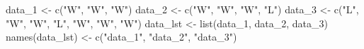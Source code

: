 \documentclass[
]{book}
\newenvironment{Shaded}{\begin{snugshade}}{\end{snugshade}}
\newcommand{\FunctionTok}[1]{\textcolor[rgb]{0.00,0.00,0.00}{#1}}
\newcommand{\NormalTok}[1]{#1}
\newcommand{\OtherTok}[1]{\textcolor[rgb]{0.56,0.35,0.01}{#1}}
\newcommand{\StringTok}[1]{\textcolor[rgb]{0.31,0.60,0.02}{#1}}
\begin{document}
\begin{Shaded}
\begin{Highlighting}[]
\NormalTok{data\_1 }\OtherTok{\textless{}{-}} \FunctionTok{c}\NormalTok{(}\StringTok{"W"}\NormalTok{, }\StringTok{"W"}\NormalTok{, }\StringTok{"W"}\NormalTok{)}
\NormalTok{data\_2 }\OtherTok{\textless{}{-}} \FunctionTok{c}\NormalTok{(}\StringTok{"W"}\NormalTok{, }\StringTok{"W"}\NormalTok{, }\StringTok{"W"}\NormalTok{, }\StringTok{"L"}\NormalTok{)}
\NormalTok{data\_3 }\OtherTok{\textless{}{-}} \FunctionTok{c}\NormalTok{(}\StringTok{"L"}\NormalTok{, }\StringTok{"W"}\NormalTok{, }\StringTok{"W"}\NormalTok{, }\StringTok{"L"}\NormalTok{, }\StringTok{"W"}\NormalTok{, }\StringTok{"W"}\NormalTok{, }\StringTok{"W"}\NormalTok{)}
\NormalTok{data\_lst }\OtherTok{\textless{}{-}} \FunctionTok{list}\NormalTok{(data\_1, data\_2, data\_3)}
\FunctionTok{names}\NormalTok{(data\_lst) }\OtherTok{\textless{}{-}} \FunctionTok{c}\NormalTok{(}\StringTok{"data\_1"}\NormalTok{, }\StringTok{"data\_2"}\NormalTok{, }\StringTok{"data\_3"}\NormalTok{)}
\end{Highlighting}
\end{Shaded}
\end{document}
